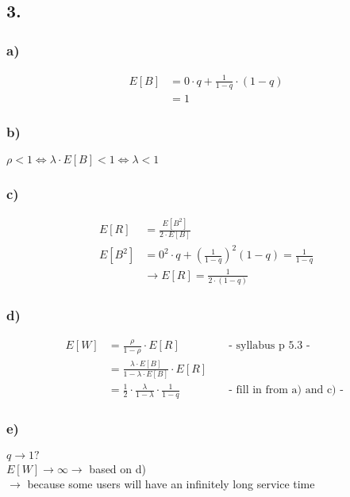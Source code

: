 \subsection*{ 3. }

\subsubsection*{ a) }
\begin{align*}
E\left[B\right]&=0\cdot q+\frac{1}{1-q}\cdot \left(1-q\right)\\
&=1
\end{align*}

\subsubsection*{ b) }

$\rho < 1 \Leftrightarrow \lambda \cdot E\left[B\right]< 1 \Leftrightarrow \lambda < 1$

\subsubsection*{ c) }
\begin{align*}
E\left[R\right]&=\frac{E\left[B^{2}\right]}{2\cdot E\left[B\right]}\\
E\left[B^{2}\right]&=0^{2}\cdot q+\left(\frac{1}{1-q}\right)^{2}\left(1-q\right)=\frac{1}{1-q}\\
&\rightarrow E\left[R\right]=\frac{1}{2\cdot \left(1-q\right)}
\end{align*}

\subsubsection*{ d) }
\begin{align*}
E\left[W\right]&=\frac{\rho }{1-\rho }\cdot E\left[R\right] && \text{ - syllabus p 5.3 - }\\
&=\frac{\lambda \cdot E\left[B\right]}{1-\lambda \cdot E\left[B\right]}\cdot E\left[R\right]\\
&=\frac{1}{2}\cdot \frac{\lambda }{1-\lambda }\cdot \frac{1}{1-q} && \text{ - fill in from a) and c) - }
\end{align*}

\subsubsection*{ e) }
$q\rightarrow 1?$\\
$E\left[W\right]\rightarrow \infty \rightarrow$ based on d)\\
$\rightarrow$ because some users will have an infinitely long service time

